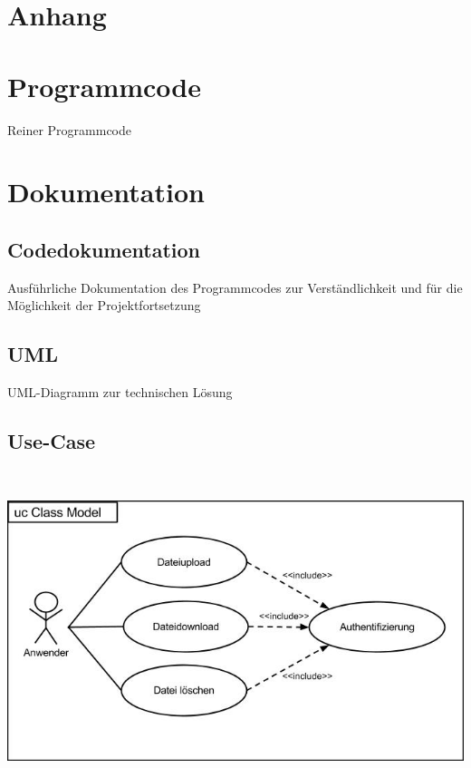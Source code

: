 \documentclass[12pt,a4paper,bibliography=totocnumbered,listof=totocnumbered]{scrartcl}
\begin{document}
\begin{appendix}
\section*{Anhang}
{}
\section{Programmcode}
Reiner Programmcode
\pagebreak
\section{Dokumentation}
\subsection{Codedokumentation}
Ausführliche Dokumentation des Programmcodes zur Verständlichkeit und für die Möglichkeit der Projektfortsetzung
\subsection{UML}
UML-Diagramm zur technischen Lösung
\pagebreak

\subsection{Use-Case}
\vspace{1em}
$\;$\\
\begin{minipage}{\linewidth}
	\centering
	\includegraphics[width=0.7\linewidth]{UseCase.jpg}
\end{minipage}
\vspace{1em}


\end{appendix}
\end{document}
